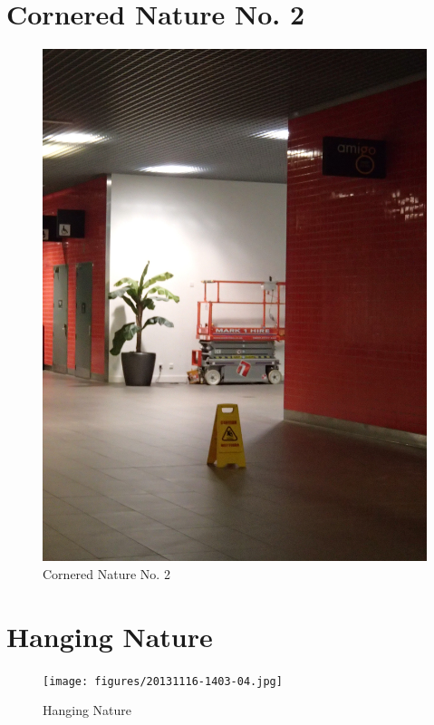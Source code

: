 \documentclass{book}
\begin{document}
\chapter{Cornered Nature No. 2}

\begin{figure}
\centering
\includegraphics[width=\textwidth,angle=-90]{figures/P1050158.JPG}
\caption{Cornered Nature No. 2}
\end{figure}

\chapter{Hanging Nature}

\begin{figure}
\centering
\texttt{[image: figures/20131116-1403-04.jpg]}
\caption{Hanging Nature}
\end{figure}
\end{document}
